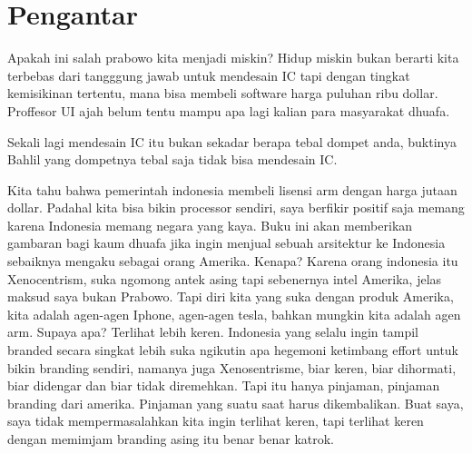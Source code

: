 \chapter{Pengantar}

Apakah ini salah prabowo kita menjadi miskin? Hidup miskin bukan berarti kita terbebas dari tangggung jawab untuk mendesain IC tapi dengan tingkat kemisikinan tertentu, mana bisa membeli software harga puluhan ribu dollar. Proffesor UI ajah belum tentu mampu apa lagi kalian para masyarakat dhuafa.

Sekali lagi mendesain IC itu bukan sekadar berapa tebal dompet anda, buktinya Bahlil yang dompetnya tebal saja tidak bisa mendesain IC. 

Kita tahu bahwa pemerintah indonesia membeli lisensi arm dengan harga jutaan dollar. Padahal kita bisa bikin processor sendiri, saya berfikir positif saja memang karena Indonesia memang negara yang kaya. Buku ini akan memberikan gambaran bagi kaum dhuafa jika ingin menjual sebuah arsitektur ke Indonesia sebaiknya mengaku sebagai orang Amerika. Kenapa? Karena orang indonesia itu Xenocentrism, suka ngomong antek asing tapi sebenernya intel Amerika, jelas maksud saya bukan Prabowo. Tapi diri kita yang suka dengan produk Amerika, kita adalah agen-agen Iphone, agen-agen tesla, bahkan mungkin kita adalah agen arm. Supaya apa? Terlihat lebih keren. Indonesia yang selalu ingin tampil branded secara singkat lebih suka ngikutin apa hegemoni ketimbang effort untuk bikin branding sendiri, namanya juga Xenosentrisme, biar keren, biar dihormati, biar didengar dan biar tidak diremehkan. Tapi itu hanya pinjaman, pinjaman branding dari amerika. Pinjaman yang suatu saat harus dikembalikan. Buat saya, saya tidak mempermasalahkan kita ingin terlihat keren, tapi terlihat keren dengan memimjam branding asing itu benar benar katrok.  